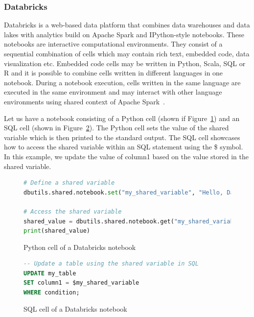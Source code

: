 \subsubsection{Databricks}
Databricks is a web-based data platform that combines data warehouses and data lakes with analytics build on Apache Spark and IPython-style notebooks. These notebooks are interactive computational environments. They consist of a sequential combination of cells which may contain rich text, embedded code, data visualization etc. Embedded code cells may be written in Python, Scala, SQL or R and it is possible to combine cells written in different languages in one notebook. During a notebook execution, cells written in the same language are executed in the same environment and may interact with other language environments using shared context of Apache Spark~\cite{databricks}.
\par
Let us have a notebook consisting of a Python cell (shown if Figure~\ref{fig:pythonDatabricks}) and an SQL cell (shown in Figure~\ref{fig:sqlDatabricks}). The Python cell sets the value of the shared variable which is then printed to the standard output. The SQL cell showcases how to access the shared variable within an SQL statement using the \$ symbol. In this example, we update the value of column1 based on the value stored in the shared variable.

\begin{figure}[ht]
\begin{lstlisting}[language=Python]
# Define a shared variable
dbutils.shared.notebook.set("my_shared_variable", "Hello, Databricks!")

# Access the shared variable
shared_value = dbutils.shared.notebook.get("my_shared_variable")
print(shared_value)
\end{lstlisting}
\caption{Python cell of a Databricks notebook}
\label{fig:pythonDatabricks}
\end{figure}

\begin{figure}[ht]
\begin{lstlisting}[language=SQL]
-- Update a table using the shared variable in SQL
UPDATE my_table
SET column1 = $my_shared_variable
WHERE condition;
\end{lstlisting}
\caption{SQL cell of a Databricks notebook}
\label{fig:sqlDatabricks}
\end{figure}

